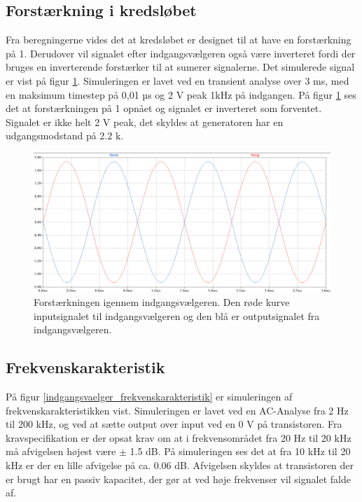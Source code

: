 \subsection*{Forstærkning i kredsløbet}
Fra beregningerne vides det at kredsløbet er designet til at have en forstærkning på 1. Derudover vil signalet efter indgangsvælgeren også være inverteret fordi der bruges en inverterende forstærker til at sumerer signalerne. Det simulerede signal er vist på figur \ref{indgangsvaelger_input/output}. Simuleringen er lavet ved en transient analyse over 3 ms, med en maksimum timestep på 0,01 µs og 2 V peak 1kHz på indgangen. På figur \ref{indgangsvaelger_input/output} ses det at forstærkningen på 1 opnået og signalet er inverteret som forventet. Signalet er ikke helt 2 V peak, det skyldes at generatoren har en udgangsmodstand på 2.2 k\ohm.
\begin{figure}[h]
\centering
\includegraphics[scale=0.3]{teknisk/indgangsvaelger/simulering/input_output.png}
\caption{Forstærkningen igennem indgangsvælgeren. Den røde kurve inputsignalet til indgangsvælgeren og den blå er outputsignalet fra indgangsvælgeren.}
\label{indgangsvaelger_input/output}
\end{figure}

\subsection*{Frekvenskarakteristik}
På figur \ref{indgangsvaelger_frekvenskarakteristik} er simuleringen af frekvenskarakteristikken vist. Simuleringen er lavet ved en AC-Analyse fra 2 Hz til 200 kHz, og ved at sætte output over input ved en 0 V på transistoren. Fra kravspecifikation er der opsat krav om at i frekvensområdet fra 20 Hz til 20 kHz må afvigelsen højest være $\pm$ 1.5 dB. På simuleringen ses det at fra 10 kHz til 20 kHz er der en lille afvigelse på ca. 0.06 dB. Afvigelsen skyldes at transistoren der er brugt har en passiv kapacitet, der gør at ved høje frekvenser vil signalet falde af.

